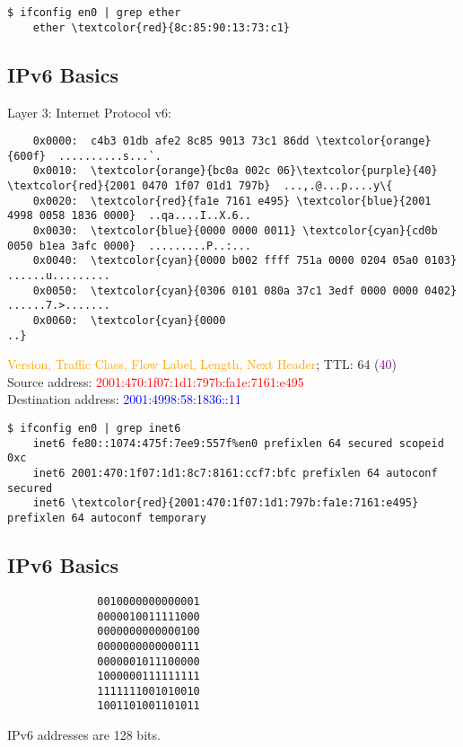 \documentclass[xga]{xdvislides}
\begin{document}
\begin{Verbatim}
$ ifconfig en0 | grep ether
	ether \textcolor{red}{8c:85:90:13:73:c1}
\end{Verbatim}

\subsection{IPv6 Basics}
Layer 3: Internet Protocol v6:
\begin{Verbatim}
	0x0000:  c4b3 01db afe2 8c85 9013 73c1 86dd \textcolor{orange}{600f}  ..........s...`.
	0x0010:  \textcolor{orange}{bc0a 002c 06}\textcolor{purple}{40} \textcolor{red}{2001 0470 1f07 01d1 797b}  ...,.@...p....y\{
	0x0020:  \textcolor{red}{fa1e 7161 e495} \textcolor{blue}{2001 4998 0058 1836 0000}  ..qa....I..X.6..
	0x0030:  \textcolor{blue}{0000 0000 0011} \textcolor{cyan}{cd0b 0050 b1ea 3afc 0000}  .........P..:...
	0x0040:  \textcolor{cyan}{0000 b002 ffff 751a 0000 0204 05a0 0103}  ......u.........
	0x0050:  \textcolor{cyan}{0306 0101 080a 37c1 3edf 0000 0000 0402}  ......7.>.......
	0x0060:  \textcolor{cyan}{0000                                     ..}
\end{Verbatim}

\vspace{.15in}
\textcolor{orange}{Version, Traffic Class, Flow Label, Length, Next Header}; TTL: 64 (\textcolor{purple}{40}) \\
Source address: \textcolor{red}{2001:470:1f07:1d1:797b:fa1e:7161:e495} \\
Destination address: \textcolor{blue}{2001:4998:58:1836::11}
\vspace{.15in}

\begin{Verbatim}
$ ifconfig en0 | grep inet6
	inet6 fe80::1074:475f:7ee9:557f%en0 prefixlen 64 secured scopeid 0xc 
	inet6 2001:470:1f07:1d1:8c7:8161:ccf7:bfc prefixlen 64 autoconf secured 
	inet6 \textcolor{red}{2001:470:1f07:1d1:797b:fa1e:7161:e495} prefixlen 64 autoconf temporary 
\end{Verbatim}

\subsection{IPv6 Basics}
\Hugesize
\begin{center}
\begin{verbatim}
              0010000000000001
              0000010011111000
              0000000000000100
              0000000000000111
              0000001011100000
              1000000111111111
              1111111001010010
              1001101001101011
\end{verbatim}
\vspace{.5in}
IPv6 addresses are 128 bits.
\end{center}
\Normalsize
\end{document}
